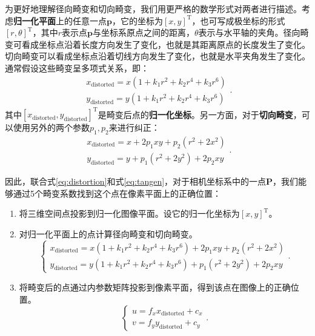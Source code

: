 为更好地理解径向畸变和切向畸变，我们用更严格的数学形式对两者进行描述。考虑\textbf{归一化平面}上的任意一点$\bm{p}$，它的坐标为$[x,y]^\mathrm{T}$，也可写成极坐标的形式$[r,\theta]^\mathrm{T}$，其中$r$表示点$\bm{p}$与坐标系原点之间的距离，$\theta$表示与水平轴的夹角。径向畸变可看成坐标点沿着长度方向发生了变化，也就是其距离原点的长度发生了变化。切向畸变可以看成坐标点沿着切线方向发生了变化，也就是水平夹角发生了变化。通常假设这些畸变呈多项式关系，即：
\begin{equation}
\label{eq:distortion} 
\begin{matrix}
x_\mathrm{distorted} = x(1+k_1r^2+k_2r^4+k_3r^6)\\
y_\mathrm{distorted} = y(1+k_1r^2+k_2r^4+k_3r^6)
\end{matrix}.
\end{equation}
其中$[x_\mathrm{distorted},y_\mathrm{distorted}]^\mathrm{T}$是畸变后点的\textbf{归一化坐标}。另一方面，对于\textbf{切向畸变}，可以使用另外的两个参数$p_1,p_2$来进行纠正：
\begin{equation}
\label{eq:tangen} 
\begin{matrix}
x_\mathrm{distorted} = x+2p_1xy+p_2(r^2+2x^2)\\
y_\mathrm{distorted} = y+p_1(r^2+2y^2)+2p_2xy
\end{matrix}. 
\end{equation}

因此，联合式\eqref{eq:distortion}和式\eqref{eq:tangen}，对于相机坐标系中的一点$\bm{P}$，我们能够通过5个畸变系数找到这个点在像素平面上的正确位置：

\begin{enumerate}
\item 将三维空间点投影到归一化图像平面。设它的归一化坐标为$[x,y]^\mathrm{T}$。

\item 对归一化平面上的点计算径向畸变和切向畸变。
\begin{equation}
\left\{\begin{matrix} x_\mathrm{distorted} =x(1+k_1r^2+k_2r^4+k_3r^6)+2p_1xy+p_2(r^2+2x^2)\\ 
y_\mathrm{distorted} = y(1+k_1r^2+k_2r^4+k_3r^6)+p_1(r^2+2y^2)+2p_2xy
\end{matrix}\right. .
\end{equation}
\item 将畸变后的点通过内参数矩阵投影到像素平面，得到该点在图像上的正确位置。
\begin{equation}
\left\{\begin{matrix} u=f_x x_\mathrm{distorted} + c_x\\ v=f_y y_\mathrm{distorted} + c_y\end{matrix}\right. .
\end{equation}
\end{enumerate}

